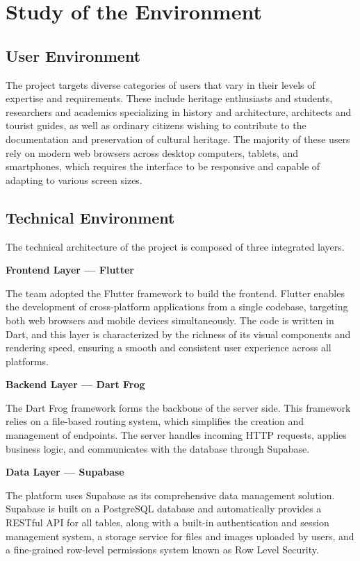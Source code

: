 \documentclass[12pt]{article}
\begin{document}
\newpage

\section{Study of the Environment}
\subsection{User Environment}
The project targets diverse categories of users that vary in their levels of expertise and requirements. These include heritage enthusiasts and students, researchers and academics specializing in history and architecture, architects and tourist guides, as well as ordinary citizens wishing to contribute to the documentation and preservation of cultural heritage.
The majority of these users rely on modern web browsers across desktop computers, tablets, and smartphones, which requires the interface to be responsive and capable of adapting to various screen sizes.
\subsection{Technical Environment}
The technical architecture of the project is composed of three integrated layers.

\textbf{Frontend Layer — Flutter}

The team adopted the Flutter framework to build the frontend. Flutter enables the development of cross-platform applications from a single codebase, targeting both web browsers and mobile devices simultaneously. The code is written in Dart, and this layer is characterized by the richness of its visual components and rendering speed, ensuring a smooth and consistent user experience across all platforms.

\textbf{Backend Layer — Dart Frog}

The Dart Frog framework forms the backbone of the server side. This framework relies on a file-based routing system, which simplifies the creation and management of endpoints. The server handles incoming HTTP requests, applies business logic, and communicates with the database through Supabase.

\textbf{Data Layer — Supabase}

The platform uses Supabase as its comprehensive data management solution. Supabase is built on a PostgreSQL database and automatically provides a RESTful API for all tables, along with a built-in authentication and session management system, a storage service for files and images uploaded by users, and a fine-grained row-level permissions system known as Row Level Security.
\end{document}
